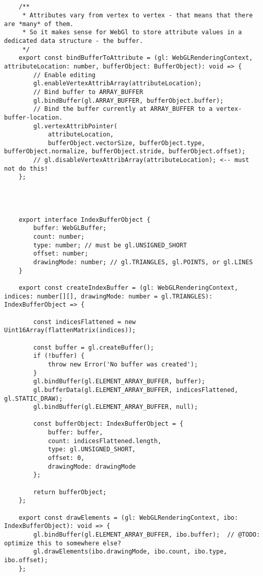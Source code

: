 {\begin{lstlisting}
    
    
    /**
     * Attributes vary from vertex to vertex - that means that there are *many* of them.
     * So it makes sense for WebGl to store attribute values in a dedicated data structure - the buffer.
     */
    export const bindBufferToAttribute = (gl: WebGLRenderingContext, attributeLocation: number, bufferObject: BufferObject): void => {
        // Enable editing
        gl.enableVertexAttribArray(attributeLocation);
        // Bind buffer to ARRAY_BUFFER
        gl.bindBuffer(gl.ARRAY_BUFFER, bufferObject.buffer);
        // Bind the buffer currently at ARRAY_BUFFER to a vertex-buffer-location.
        gl.vertexAttribPointer(
            attributeLocation,
            bufferObject.vectorSize, bufferObject.type, bufferObject.normalize, bufferObject.stride, bufferObject.offset);
        // gl.disableVertexAttribArray(attributeLocation); <-- must not do this!
    };
    
    
    
    
    export interface IndexBufferObject {
        buffer: WebGLBuffer;
        count: number;
        type: number; // must be gl.UNSIGNED_SHORT
        offset: number;
        drawingMode: number; // gl.TRIANGLES, gl.POINTS, or gl.LINES
    }
    
    export const createIndexBuffer = (gl: WebGLRenderingContext, indices: number[][], drawingMode: number = gl.TRIANGLES): IndexBufferObject => {
    
        const indicesFlattened = new Uint16Array(flattenMatrix(indices));
    
        const buffer = gl.createBuffer();
        if (!buffer) {
            throw new Error('No buffer was created');
        }
        gl.bindBuffer(gl.ELEMENT_ARRAY_BUFFER, buffer);
        gl.bufferData(gl.ELEMENT_ARRAY_BUFFER, indicesFlattened, gl.STATIC_DRAW);
        gl.bindBuffer(gl.ELEMENT_ARRAY_BUFFER, null);
    
        const bufferObject: IndexBufferObject = {
            buffer: buffer,
            count: indicesFlattened.length,
            type: gl.UNSIGNED_SHORT,
            offset: 0,
            drawingMode: drawingMode
        };
    
        return bufferObject;
    };
    
    export const drawElements = (gl: WebGLRenderingContext, ibo: IndexBufferObject): void => {
        gl.bindBuffer(gl.ELEMENT_ARRAY_BUFFER, ibo.buffer);  // @TODO: optimize this to somewhere else?
        gl.drawElements(ibo.drawingMode, ibo.count, ibo.type, ibo.offset);
    };
    

\end{lstlisting}}
